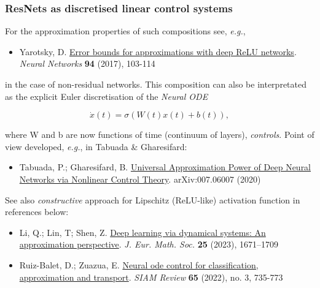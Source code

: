 \documentclass[9pt]{beamer}
\begin{document}
\begin{frame}
\frametitle{\bf ResNets as discretised linear control systems}
For the approximation properties of such compositions see, \emph{e.g.},

\begin{itemize}
\item
  Yarotsky, D. \href{https://doi.org/10.1016/j.neunet.2017.07.002}{Error
  bounds for approximations with deep ReLU networks}. \emph{Neural
  Networks} \textbf{94} (2017), 103-114
\end{itemize}

in the case of non-residual networks. This composition can also be
interpretated as the explicit Euler discretisation of the \emph{Neural
ODE}

\[ \dot{x}(t) = \sigma(W(t)x(t)+b(t)), \]

where W and
b are now functions of time (continuum of
layers), \emph{controls}. Point of view developed, \emph{e.g.}, in
Tabuada \& Gharesifard:

\begin{itemize}
\item
  Tabuada, P.; Gharesifard, B.
  \href{https://arxiv.org/abs/2007.06007}{Universal Approximation Power
  of Deep Neural Networks via Nonlinear Control Theory}. arXiv:007.06007
  (2020)
\end{itemize}

See also \emph{constructive} approach for Lipschitz (ReLU-like)
activation function in references below:

\begin{itemize}
\item
  Li, Q.; Lin, T; Shen, Z.
  \href{https://ems.press/content/serial-article-files/32852}{Deep
  learning via dynamical systems: An approximation perspective}.
  \emph{J. Eur. Math. Soc.} \textbf{25} (2023), 1671--1709
\item
  Ruiz-Balet, D.; Zuazua, E.
  \href{https://epubs.siam.org/doi/10.1137/21M1411433}{Neural ode
  control for classification, approximation and transport}. \emph{SIAM
  Review} \textbf{65} (2022), no. 3, 735-773
\end{itemize}

\end{frame}
\end{document}
